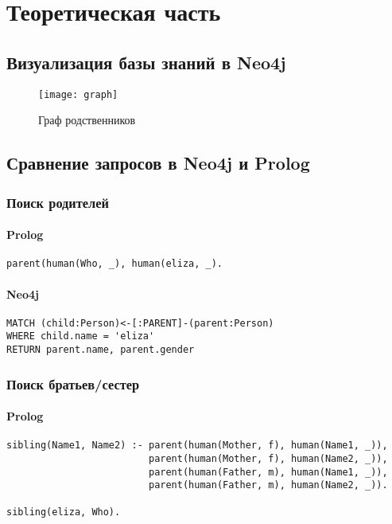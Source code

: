 \setcounter{page}{3}

\chapter{Теоретическая часть}



\section{Визуализация базы знаний в Neo4j}

\begin{figure}[h!]
\centering
    \texttt{[image: graph]}
    \caption{Граф родственников}
    \label{img:parents}	
\end{figure}

\section{Сравнение запросов в Neo4j и Prolog}

\subsection{Поиск родителей}

\subsubsection{Prolog}
\begin{lstlisting}[label=div,caption=Запрос]
parent(human(Who, _), human(eliza, _).
\end{lstlisting}

\subsubsection{Neo4j}
\begin{lstlisting}[label=div,caption=Запрос]
MATCH (child:Person)<-[:PARENT]-(parent:Person)
WHERE child.name = 'eliza'
RETURN parent.name, parent.gender
\end{lstlisting}


\subsection{Поиск братьев/сестер}

\subsubsection{Prolog}
\begin{lstlisting}[label=div,caption=Запрос]
sibling(Name1, Name2) :- parent(human(Mother, f), human(Name1, _)), 
	                     parent(human(Mother, f), human(Name2, _)),
	                     parent(human(Father, m), human(Name1, _)), 
	                     parent(human(Father, m), human(Name2, _)).

sibling(eliza, Who).
\end{lstlisting}


